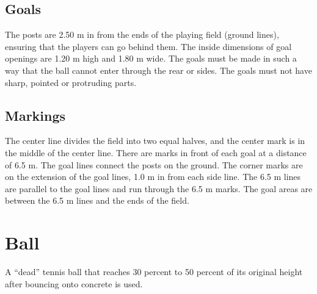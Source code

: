 \subsection{Goals}
The posts are 2.50 m in from the ends of the playing field (ground lines), ensuring that the players can go behind them.
The inside dimensions of goal openings are 1.20 m high and 1.80 m wide.
The goals must be made in such a way that the ball cannot enter through the rear or sides. The goals must not have sharp, pointed or protruding parts.

\subsection{Markings}
The center line divides the field into two equal halves, and the center mark is in the middle of the center line.
There are marks in front of each goal at a distance of 6.5 m.
The goal lines connect the posts on the ground.
The corner marks are on the extension of the goal lines, 1.0 m in from each side line.
The 6.5 m lines are parallel to the goal lines and run through the 6.5 m marks.
The goal areas are between the 6.5 m lines and the ends of the field.

\section{Ball}
A ``dead'' tennis ball that reaches 30 percent to 50 percent of its original height after bouncing onto concrete is used.
